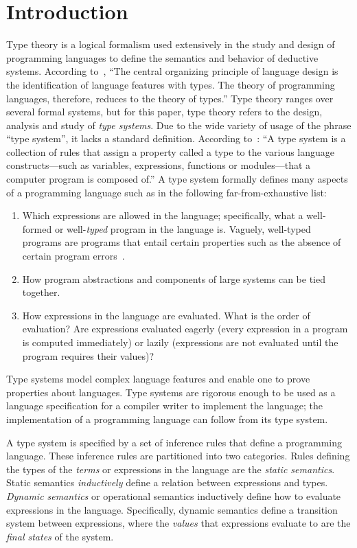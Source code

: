 \section{Introduction}
Type theory is a logical formalism used extensively
in the study and design of programming languages to define the
semantics and behavior of deductive systems.
According to~\cite{harpercourse},
``The central organizing principle of language design is the
identification of language features with types.
The theory of programming languages, therefore, reduces to the
theory of types.''
Type theory ranges over several formal systems,
but for this paper, type theory refers to
the design, analysis and study of \emph{type systems}.
Due to the wide variety of usage of the phrase
``type system'', it lacks a standard definition.
According to~\cite{typesystems-wikipedia}:
``A type system is a collection of rules that assign a property
called a type to the various language constructs---such as variables, expressions, functions or modules---that a computer program is composed of.''
A type system formally defines many aspects of a programming language
such as in the following far-from-exhaustive list:
\begin{enumerate}
\item Which expressions are allowed in the language;
specifically, what a well-formed or well-\emph{typed} program in the
language is.
Vaguely, well-typed programs are programs that entail certain
properties such as the absence of certain program errors~\cite{Pierce:2002:TPL:509043}.
\item How program abstractions and components of
large systems can be tied together.
\item How expressions in the language are evaluated.
What is the order of evaluation?
Are expressions evaluated eagerly
(every expression in a program is computed immediately)
or lazily
(expressions are not evaluated until the program
requires their values)?
\end{enumerate}
Type systems model complex language features
and enable one to prove properties about languages.
Type systems are rigorous enough to be
used as a language specification for a compiler
writer to implement the language;
the implementation of a programming language
can follow from its type system.

A type system is specified by a set of inference rules
that define a programming language.
These inference rules are partitioned into two categories.
Rules defining the types of the \emph{terms} or expressions in
the language are the \emph{static semantics}.
Static semantics \emph{inductively} define
a relation between expressions and types.
\emph{Dynamic semantics} or operational semantics inductively
define how to evaluate expressions in the language.
Specifically, dynamic semantics define
a transition system between expressions, where
the \emph{values} that expressions evaluate to are
the \emph{final states} of the system.

